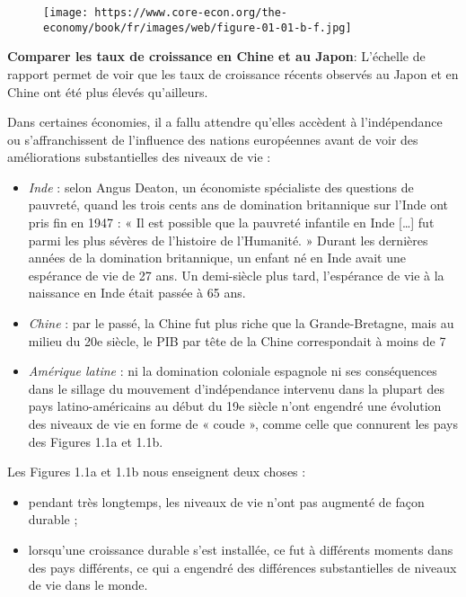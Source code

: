 \documentclass[11pt]{amsart}
\begin{document}
\begin{figure}[h]{}
\centering\texttt{[image: https://www.core-econ.org/the-economy/book/fr/images/web/figure-01-01-b-f.jpg]}
\caption{}

\end{figure}

\textbf{Comparer les taux de croissance en Chine et au Japon}: L’échelle de rapport permet de voir que les taux de croissance récents observés au Japon et en Chine ont été plus élevés qu’ailleurs.


Dans certaines économies, il a fallu attendre qu’elles accèdent à l’indépendance ou s’affranchissent de l’influence des nations européennes avant de voir des améliorations substantielles des niveaux de vie :


\begin{itemize}

\item \emph{Inde} : selon Angus Deaton, un économiste spécialiste des questions de pauvreté, quand les trois cents ans de domination britannique sur l’Inde ont pris fin en 1947 : « Il est possible que la pauvreté infantile en Inde  […] fut parmi les plus sévères de l’histoire de l’Humanité. » Durant les dernières années de la domination britannique, un enfant né en Inde avait une espérance de vie de 27 ans. Un demi-siècle plus tard, l’espérance de vie à la naissance en Inde était passée à 65 ans.

\item \emph{Chine} : par le passé, la Chine fut plus riche que la Grande-Bretagne, mais au milieu du 20e siècle, le PIB par tête de la Chine correspondait à moins de 7 %

\item \emph{Amérique latine} : ni la domination coloniale espagnole ni ses conséquences dans le sillage du mouvement d’indépendance intervenu dans la plupart des pays latino-américains au début du 19e siècle n’ont engendré une évolution des niveaux de vie en forme de « coude », comme celle que connurent les pays des Figures 1.1a et 1.1b.

\end{itemize}


Les Figures 1.1a et 1.1b nous enseignent deux choses :


\begin{itemize}

\item pendant très longtemps, les niveaux de vie n’ont pas augmenté de façon durable ;

\item lorsqu’une croissance durable s’est installée, ce fut à différents moments dans des pays différents, ce qui a engendré des différences substantielles de niveaux de vie dans le monde.

\end{itemize}
\end{document}
